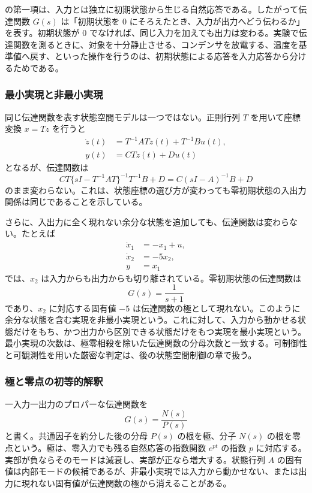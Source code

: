  の第一項は、入力とは独立に初期状態から生じる自然応答である。したがって伝達関数 $G(s)$ は「初期状態を 0 にそろえたとき、入力が出力へどう伝わるか」を表す。初期状態が 0 でなければ、同じ入力を加えても出力は変わる。実験で伝達関数を測るときに、対象を十分静止させる、コンデンサを放電する、温度を基準値へ戻す、といった操作を行うのは、初期状態による応答を入力応答から分けるためである。

\subsubsection{最小実現と非最小実現}

同じ伝達関数を表す状態空間モデルは一つではない。正則行列 $T$ を用いて座標変換 $x=Tz$ を行うと
\begin{align}
  \dot{z}(t)&=T^{-1}ATz(t)+T^{-1}Bu(t),\\
  y(t)&=CTz(t)+Du(t)
\end{align}
となるが、伝達関数は
\begin{equation}
  CT\{sI-T^{-1}AT\}^{-1}T^{-1}B+D
  =
  C(sI-A)^{-1}B+D
\end{equation}
のまま変わらない。これは、状態座標の選び方が変わっても零初期状態の入出力関係は同じであることを示している。

さらに、入出力に全く現れない余分な状態を追加しても、伝達関数は変わらない。たとえば
\begin{align}
  \dot{x}_1&=-x_1+u,\\
  \dot{x}_2&=-5x_2,\\
  y&=x_1
\end{align}
では、$x_2$ は入力からも出力からも切り離されている。零初期状態の伝達関数は
\begin{equation}
  G(s)=\frac{1}{s+1}
\end{equation}
であり、$x_2$ に対応する固有値 $-5$ は伝達関数の極として現れない。このように余分な状態を含む実現を非最小実現という。これに対して、入力から動かせる状態だけをもち、かつ出力から区別できる状態だけをもつ実現を最小実現という。最小実現の次数は、極零相殺を除いた伝達関数の分母次数と一致する。可制御性と可観測性を用いた厳密な判定は、後の状態空間制御の章で扱う。

\subsubsection{極と零点の初等的解釈}

一入力一出力のプロパーな伝達関数を
\begin{equation}
  G(s)=\frac{N(s)}{P(s)}
\end{equation}
と書く。共通因子を約分した後の分母 $P(s)$ の根を極、分子 $N(s)$ の根を零点という。極は、零入力でも残る自然応答の指数関数 $e^{pt}$ の指数 $p$ に対応する。実部が負ならそのモードは減衰し、実部が正なら増大する。状態行列 $A$ の固有値は内部モードの候補であるが、非最小実現では入力から動かせない、または出力に現れない固有値が伝達関数の極から消えることがある。

